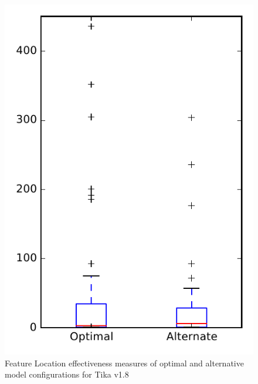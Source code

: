 
\begin{figure}
\centering
\includegraphics[height=0.4\textheight]{figures/combo/flt_rq1_tika}
\caption{Feature Location effectiveness measures of optimal and alternative model configurations for Tika v1.8}
\label{fig:combo:flt:rq1:tika}
\end{figure}
